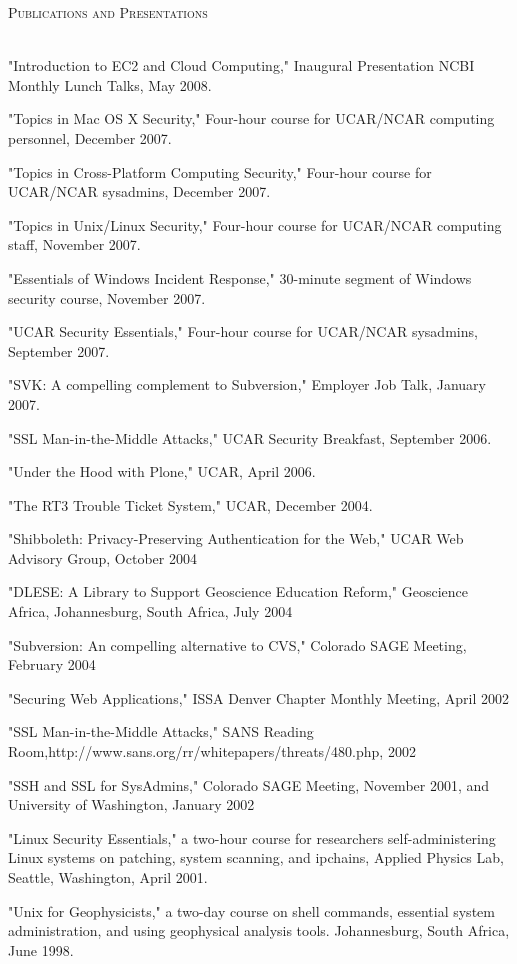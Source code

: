 \documentclass{article}
\newcommand{\lineunder}{\vspace*{-8pt} \\ \hspace*{-18pt} \hrulefill \\}
\newcommand{\header}[1]{{\hspace*{-15pt}\vspace*{6pt} \textsc{#1}} \vspace*{-6pt} \lineunder}
\newenvironment{achievements}{\begin{list}{\topsep 0pt \itemsep -2pt}} {\vspace*{4pt}\end{list}}
\begin{document}
\header{Publications and Presentations}
\begin{achievements}
\item "Introduction to EC2 and Cloud Computing," Inaugural Presentation NCBI Monthly Lunch Talks, May 2008.
\item "Topics in Mac OS X Security," Four-hour course for UCAR/NCAR computing personnel, December 2007.
\item "Topics in Cross-Platform Computing Security," Four-hour course for UCAR/NCAR sysadmins, December 2007.  
\item "Topics in Unix/Linux Security," Four-hour course for UCAR/NCAR computing staff, November 2007.
\item "Essentials of Windows Incident Response," 30-minute segment of Windows security course, November 2007.
\item "UCAR Security Essentials,"  Four-hour course for UCAR/NCAR sysadmins, September 2007.
\item "SVK: A compelling complement to Subversion," Employer Job Talk, January 2007.
\item "SSL Man-in-the-Middle Attacks," UCAR Security Breakfast, September 2006.
\item "Under the Hood with Plone," UCAR, April 2006.
\item "The RT3 Trouble Ticket System," UCAR, December 2004.  
\item "Shibboleth: Privacy-Preserving Authentication for the Web," UCAR Web Advisory Group, October 2004
\item "DLESE: A Library to Support Geoscience Education Reform," Geoscience Africa, Johannesburg, South Africa, July 2004
\item "Subversion: An compelling alternative to CVS," Colorado SAGE Meeting, February 2004
\item "Securing Web Applications," ISSA Denver Chapter Monthly Meeting, April 2002
\item "SSL Man-in-the-Middle Attacks," SANS Reading Room,http://www.sans.org/rr/whitepapers/threats/480.php, 2002
\item "SSH and SSL for SysAdmins," Colorado SAGE Meeting, November 2001, and University of Washington, January 2002
\item "Linux Security Essentials," a two-hour course for researchers self-administering Linux systems on patching, system scanning, and ipchains,  Applied Physics Lab, Seattle, Washington, April 2001.
\item "Unix for Geophysicists," a two-day course on shell commands, essential system administration, and using geophysical analysis tools.  Johannesburg, South Africa, June 1998.
\end{achievements}
\end{document}
